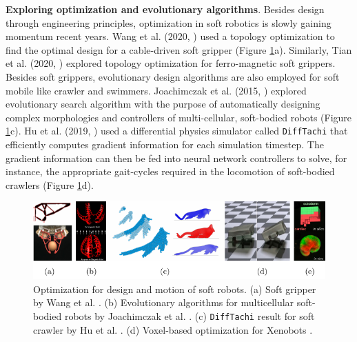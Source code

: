 \textbf{Exploring optimization and evolutionary algorithms}. Besides design through engineering principles, optimization in soft robotics is slowly gaining momentum recent years. Wang et al. (2020, \cite{Wang2020Nov}) used a topology optimization to find the optimal design for a cable-driven soft gripper (Figure \ref{fig:C0:optztypes}a). Similarly, Tian et al. (2020, \cite{Tian2020May}) explored topology optimization for ferro-magnetic soft grippers. Besides soft grippers, evolutionary design algorithms are also employed for soft mobile like crawler and swimmers. Joachimczak et al. (2015, \cite{Joachimczak2014Jul,Joachimczak2015}) explored evolutionary search algorithm with the purpose of automatically designing complex morphologies and controllers of multi-cellular, soft-bodied robots (Figure \ref{fig:C0:optztypes}c). Hu et al. (2019, \cite{Hu2019taichi}) used a differential physics simulator called \texttt{DiffTachi} that efficiently computes gradient information for each simulation timestep. The gradient information can then be fed into neural network controllers to solve, for instance, the appropriate gait-cycles required in the locomotion of soft-bodied crawlers (Figure \ref{fig:C0:optztypes}d).

\begin{figure}[!t]
  \vspace{-3mm}
  \hspace{2mm}
  \includegraphics*[width=\textwidth]{./pdf/thesis-figure-1-3.pdf}
  \vspace{-6mm}
  \caption{Optimization for design and motion of soft robots. (a) Soft gripper by Wang et al. \cite{Wang2020Nov}. (b) Evolutionary algorithms for multicellular soft-bodied robots by Joachimczak et al. \cite{Joachimczak2014Jul,Joachimczak2015}. (c) \texttt{DiffTachi} result for soft crawler by Hu et al. \cite{Hu2019taichi}. (d) Voxel-based optimization for Xenobots \cite{Kriegman2019}.}
  \label{fig:C0:optztypes}
  \vspace{-4mm}
\end{figure}

